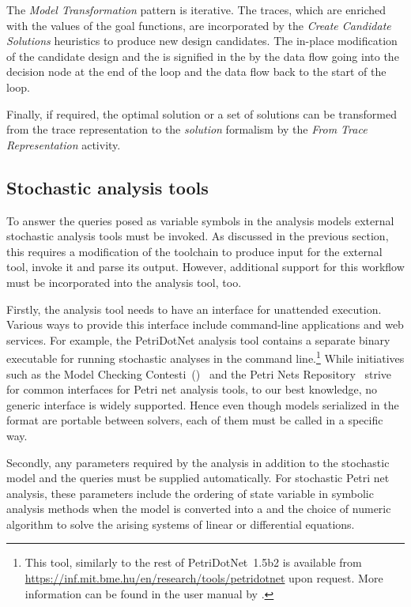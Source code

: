 The \emph{Model Transformation}  pattern is iterative. The traces, which are enriched with the values of the goal functions, are incorporated by the \emph{Create Candidate Solutions} heuristics to produce new design candidates. The in-place modification of the candidate design and the  is signified in the  by the data flow going into the decision node at the end of the loop and the data flow back to the start of the loop.

Finally, if required, the optimal solution or a set of solutions can be transformed from the trace representation to the \emph{solution} formalism by the \emph{From Trace Representation} activity.

\subsection{Stochastic analysis tools}

To answer the queries posed as variable symbols in the  analysis models external stochastic analysis tools must be invoked. As discussed in the previous section, this requires a modification of the  toolchain to produce input for the external tool, invoke it and parse its output. However, additional support for this workflow must be incorporated into the analysis tool, too.

Firstly, the analysis tool needs to have an interface for unattended execution. Various ways to provide this interface include command-line applications and web services. For example, the PetriDotNet analysis tool contains a separate binary executable for running stochastic analyses in the command line.\footnote{This tool, similarly to the rest of PetriDotNet~1.5b2 is available from \url{https://inf.mit.bme.hu/en/research/tools/petridotnet} upon request. More information can be found in the user manual by \citet{Voros17pdnmanual}.} While initiatives such as the Model Checking Contesti~()~\citep{Kordon17mcc} and the Petri Nets Repository~\citep{Hillah17repository} strive for common interfaces for Petri net analysis tools, to our best knowledge, no generic interface is widely supported. Hence even though models serialized in the  format are portable between solvers, each of them must be called in a specific way.

Secondly, any parameters required by the analysis in addition to the stochastic model and the queries must be supplied automatically. For stochastic Petri net analysis, these parameters include the ordering of state variable in symbolic analysis methods when the model is converted into a  and the choice of numeric algorithm to solve the arising systems of linear or differential equations.

